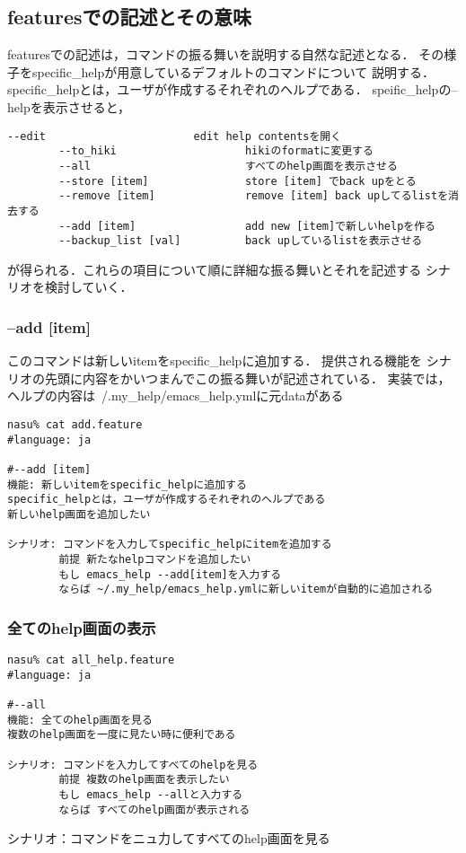 
\subsection{featuresでの記述とその意味}
featuresでの記述は，コマンドの振る舞いを説明する自然な記述となる．
その様子をspecific\_helpが用意しているデフォルトのコマンドについて
説明する．specific\_helpとは，ユーザが作成するそれぞれのヘルプである．
speific\_helpの--helpを表示させると，
\begin{lstlisting}[style=customCsh,basicstyle={\scriptsize\ttfamily}]
        --edit                       edit help contentsを開く
        --to_hiki                    hikiのformatに変更する
        --all                        すべてのhelp画面を表示させる
        --store [item]               store [item] でback upをとる
        --remove [item]              remove [item] back upしてるlistを消去する
        --add [item]                 add new [item]で新しいhelpを作る
        --backup_list [val]          back upしているlistを表示させる
\end{lstlisting}
が得られる．これらの項目について順に詳細な振る舞いとそれを記述する
シナリオを検討していく．

\subsubsection{--add [item]}
このコマンドは新しいitemをspecific\_helpに追加する．
提供される機能を
シナリオの先頭に内容をかいつまんでこの振る舞いが記述されている．
実装では，ヘルプの内容は~/.my\_help/emacs\_help.ymlに元dataがある
\begin{lstlisting}[style=customRuby,basicstyle={\scriptsize\ttfamily}]
nasu% cat add.feature
#language: ja

#--add [item]
機能: 新しいitemをspecific_helpに追加する
specific_helpとは，ユーザが作成するそれぞれのヘルプである
新しいhelp画面を追加したい

シナリオ: コマンドを入力してspecific_helpにitemを追加する
        前提 新たなhelpコマンドを追加したい
        もし emacs_help --add[item]を入力する
        ならば ~/.my_help/emacs_help.ymlに新しいitemが自動的に追加される

\end{lstlisting}
\subsubsection{全てのhelp画面の表示}\begin{lstlisting}[style=customRuby,basicstyle={\scriptsize\ttfamily}]
nasu% cat all_help.feature
#language: ja

#--all
機能: 全てのhelp画面を見る
複数のhelp画面を一度に見たい時に便利である

シナリオ: コマンドを入力してすべてのhelpを見る
        前提 複数のhelp画面を表示したい
        もし emacs_help --allと入力する
        ならば すべてのhelp画面が表示される
\end{lstlisting}
シナリオ：コマンドをニュ力してすべてのhelp画面を見る

